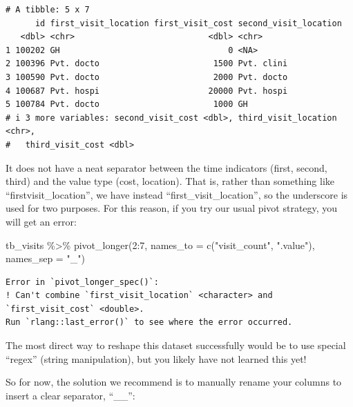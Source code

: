 \documentclass[
  letterpaper,
  DIV=11,
  numbers=noendperiod]{scrreprt}
\newenvironment{Shaded}{\begin{snugshade}}{\end{snugshade}}
\newcommand{\AttributeTok}[1]{\textcolor[rgb]{0.40,0.45,0.13}{#1}}
\newcommand{\DecValTok}[1]{\textcolor[rgb]{0.68,0.00,0.00}{#1}}
\newcommand{\FunctionTok}[1]{\textcolor[rgb]{0.28,0.35,0.67}{#1}}
\newcommand{\NormalTok}[1]{\textcolor[rgb]{0.00,0.23,0.31}{#1}}
\newcommand{\SpecialCharTok}[1]{\textcolor[rgb]{0.37,0.37,0.37}{#1}}
\newcommand{\StringTok}[1]{\textcolor[rgb]{0.13,0.47,0.30}{#1}}
\begin{document}
\begin{verbatim}
# A tibble: 5 x 7
      id first_visit_location first_visit_cost second_visit_location
   <dbl> <chr>                           <dbl> <chr>                
1 100202 GH                                  0 <NA>                 
2 100396 Pvt. docto                       1500 Pvt. clini           
3 100590 Pvt. docto                       2000 Pvt. docto           
4 100687 Pvt. hospi                      20000 Pvt. hospi           
5 100784 Pvt. docto                       1000 GH                   
# i 3 more variables: second_visit_cost <dbl>, third_visit_location <chr>,
#   third_visit_cost <dbl>
\end{verbatim}

It does not have a neat separator between the time indicators (first,
second, third) and the value type (cost, location). That is, rather than
something like ``firstvisit\_location'', we have instead
``first\_visit\_location'', so the underscore is used for two purposes.
For this reason, if you try our usual pivot strategy, you will get an
error:

\begin{Shaded}
\begin{Highlighting}[]
\NormalTok{tb\_visits }\SpecialCharTok{\%\textgreater{}\%} 
  \FunctionTok{pivot\_longer}\NormalTok{(}\DecValTok{2}\SpecialCharTok{:}\DecValTok{7}\NormalTok{, }
               \AttributeTok{names\_to =} \FunctionTok{c}\NormalTok{(}\StringTok{"visit\_count"}\NormalTok{, }\StringTok{".value"}\NormalTok{), }
               \AttributeTok{names\_sep =} \StringTok{"\_"}\NormalTok{)}
\end{Highlighting}
\end{Shaded}

\begin{verbatim}
Error in `pivot_longer_spec()`:
! Can't combine `first_visit_location` <character> and `first_visit_cost` <double>.
Run `rlang::last_error()` to see where the error occurred.
\end{verbatim}

The most direct way to reshape this dataset successfully would be to use
special ``regex'' (string manipulation), but you likely have not learned
this yet!

So for now, the solution we recommend is to manually rename your columns
to insert a clear separator, ``\_\_'':
\end{document}
